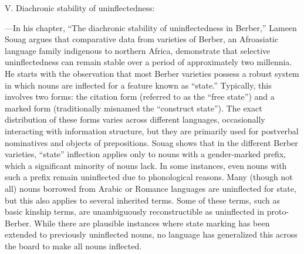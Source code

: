 \documentclass[output=paper]{langscibook}
\begin{document}
\medskip

\noindent V. Diachronic stability of uninflectedness:

\medskip

---In his chapter, ``The diachronic stability of uninflectedness in Berber,'' Lameen Souag argues that comparative data from varieties of Berber, an Afroasiatic language family indigenous to northern Africa, demonstrate that selective uninflectedness can remain stable over a period of approximately two millennia. He starts with the observation that most Berber varieties possess a robust system in which nouns are inflected for a feature known as ``state.'' Typically, this involves two forms: the citation form (referred to as the ``free state'') and a marked form (traditionally misnamed the ``construct state''). The exact distribution of these forms varies across different languages, occasionally interacting with information structure, but they are primarily used for postverbal nominatives and objects of prepositions. Souag shows that in the different Berber varieties, ``state'' inflection applies only to nouns with a gender-marked prefix, which a significant minority of nouns lack. In some instances, even nouns with such a prefix remain uninflected due to phonological reasons. Many (though not all) nouns borrowed from Arabic or Romance languages are uninflected for state, but this also applies to several inherited terms. Some of these terms, such as basic kinship terms, are unambiguously reconstructible as uninflected in proto-Berber. While there are plausible instances where state marking has been extended to previously uninflected nouns, no language has generalized this across the board to make all nouns inflected.

{\sloppy\printbibliography[heading=subbibliography,notkeyword=this]}
\end{document}
